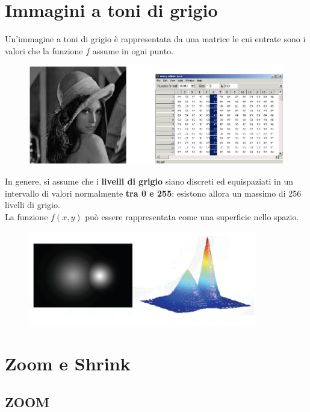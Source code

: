 \section{Immagini a toni di grigio}

Un'immagine a toni di grigio è rappresentata da una matrice le cui
entrate sono i valori che la funzione $f$ assume in ogni punto.

\begin{figure}[H]
    \centering
    \includegraphics[width=12cm, keepaspectratio]{capitoli/immagini/imgs/rappresentazione_immagine_toni_grigio.jpg}
\end{figure}

In genere, si assume che i \textbf{livelli di grigio} siano discreti ed
equispaziati in un intervallo di valori normalmente \textbf{tra 0 e 255}:
esistono allora un massimo di 256 livelli di grigio.
\\
La funzione $f (x , y)$ può essere rappresentata come una superficie
nello spazio.

\begin{figure}[H]
    \centering
    \includegraphics[width=10cm, keepaspectratio]{capitoli/immagini/imgs/funzione_toni_grigio.jpg}
\end{figure}

\section{Zoom e Shrink}

\subsection{ZOOM}

